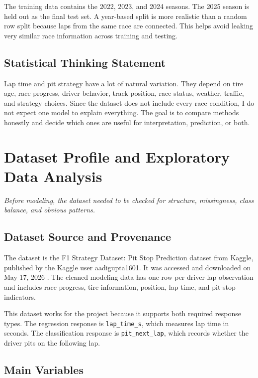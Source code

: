 \documentclass[11pt,oneside,openany]{book}
\newcommand{\chapterquote}[1]{%
\begin{center}
\small\textit{#1}
\end{center}
\vspace{-0.5em}
}
\begin{document}
The training data contains the 2022, 2023, and 2024 seasons. The 2025 season is held out as the final test set. A year-based split is more realistic than a random row split because laps from the same race are connected. This helps avoid leaking very similar race information across training and testing.

\section{Statistical Thinking Statement}

Lap time and pit strategy have a lot of natural variation. They depend on tire age, race progress, driver behavior, track position, race status, weather, traffic, and strategy choices. Since the dataset does not include every race condition, I do not expect one model to explain everything. The goal is to compare methods honestly and decide which ones are useful for interpretation, prediction, or both.


\chapter{Dataset Profile and Exploratory Data Analysis}
\chapterquote{Before modeling, the dataset needed to be checked for structure, missingness, class balance, and obvious patterns.}

\section{Dataset Source and Provenance}

The dataset is the F1 Strategy Dataset: Pit Stop Prediction dataset from Kaggle, published by the Kaggle user aadigupta1601. It was accessed and downloaded on May 17, 2026 \cite{kaggle_f1_strategy}. The cleaned modeling data has one row per driver-lap observation and includes race progress, tire information, position, lap time, and pit-stop indicators.

This dataset works for the project because it supports both required response types. The regression response is \texttt{lap\_time\_s}, which measures lap time in seconds. The classification response is \texttt{pit\_next\_lap}, which records whether the driver pits on the following lap.

\section{Main Variables}
\end{document}
